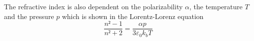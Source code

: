  The refractive index is also dependent on the polarizability $\alpha$, the temperature $T$ and the pressure $p$ which is shown in the 
 Lorentz-Lorenz equation 
 \begin{equation}
   \frac{n²-1}{n²+2} = \frac{\alpha p}{3 \varepsilon_0 k_b T} 
   \label{eqn:Lorentz_Lorenz}
 \end{equation}